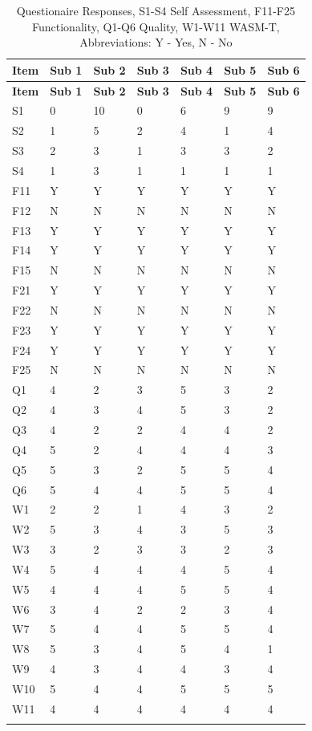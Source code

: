 \begin{appendix}
\begin{xltabular}[h]{\linewidth}{lllllll}
\caption[ReWaMP Full Empirical Evaluation Data]{ReWaMP Full Empirical Evaluation Data}\label{tbl:rewamp.empirical.full}\tabularnewline
\toprule
\textbf{Item} & \textbf{Sub 1} & \textbf{Sub 2} & \textbf{Sub 3} & \textbf{Sub 4} & \textbf{Sub 5} & \textbf{Sub 6} \tabularnewline
\midrule
\endfirsthead
\toprule
\textbf{Item} & \textbf{Sub 1} & \textbf{Sub 2} & \textbf{Sub 3} & \textbf{Sub 4} & \textbf{Sub 5} & \textbf{Sub 6} \tabularnewline
\midrule
\endhead
\small
S1 & 0 & 10 & 0 & 6 & 9 & 9\tabularnewline
S2 & 1 & 5 & 2 & 4 & 1 & 4\tabularnewline
S3 & 2 & 3 & 1 & 3 & 3 & 2\tabularnewline
S4 & 1 & 3 & 1 & 1 & 1 & 1\tabularnewline
F11 & Y & Y & Y & Y & Y & Y\tabularnewline
F12 & N & N & N & N & N & N\tabularnewline
F13 & Y & Y & Y & Y & Y & Y\tabularnewline
F14 & Y & Y & Y & Y & Y & Y\tabularnewline
F15 & N & N & N & N & N & N\tabularnewline
F21 & Y & Y & Y & Y & Y & Y\tabularnewline
F22 & N & N & N & N & N & N\tabularnewline
F23 & Y & Y & Y & Y & Y & Y\tabularnewline
F24 & Y & Y & Y & Y & Y & Y\tabularnewline
F25 & N & N & N & N & N & N\tabularnewline
Q1 & 4 & 2 & 3 & 5 & 3 & 2\tabularnewline
Q2 & 4 & 3 & 4 & 5 & 3 & 2\tabularnewline
Q3 & 4 & 2 & 2 & 4 & 4 & 2\tabularnewline
Q4 & 5 & 2 & 4 & 4 & 4 & 3\tabularnewline
Q5 & 5 & 3 & 2 & 5 & 5 & 4\tabularnewline
Q6 & 5 & 4 & 4 & 5 & 5 & 4\tabularnewline
W1 & 2 & 2 & 1 & 4 & 3 & 2\tabularnewline
W2 & 5 & 3 & 4 & 3 & 5 & 3\tabularnewline
W3 & 3 & 2 & 3 & 3 & 2 & 3\tabularnewline
W4 & 5 & 4 & 4 & 4 & 5 & 4\tabularnewline
W5 & 4 & 4 & 4 & 5 & 5 & 4\tabularnewline
W6 & 3 & 4 & 2 & 2 & 3 & 4\tabularnewline
W7 & 5 & 4 & 4 & 5 & 5 & 4\tabularnewline
W8 & 5 & 3 & 4 & 5 & 4 & 1\tabularnewline
W9 & 4 & 3 & 4 & 4 & 3 & 4\tabularnewline
W10 & 5 & 4 & 4 & 5 & 5 & 5\tabularnewline
W11 & 4 & 4 & 4 & 4 & 4 & 4\tabularnewline
\bottomrule
\caption*{Questionaire Responses, S1-S4 Self Assessment, F11-F25 Functionality, Q1-Q6 Quality, W1-W11 WASM-T, Abbreviations: Y - Yes, N - No}
\end{xltabular}
\pagebreak


\end{appendix}
